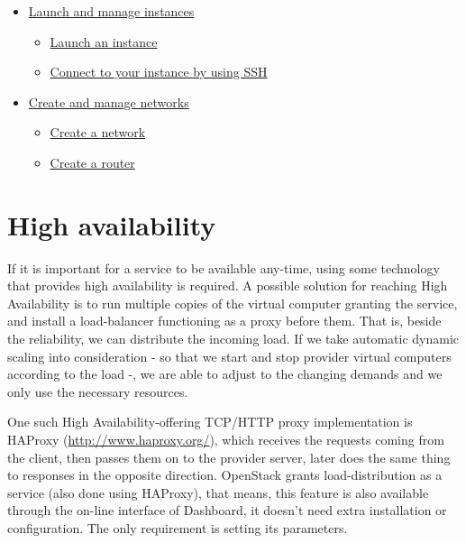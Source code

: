 \documentclass[a4paper]{article}
\begin{document}
\begin{itemize}
\begin{itemize}
\end{itemize}
  \item \href{https://docs.openstack.org/horizon/pike/user/launch-instances.html}{Launch and manage instances}
\begin{itemize}
\item \href{https://docs.openstack.org/horizon/pike/user/launch-instances.html#launch-an-instance}{Launch an instance}
\item \href{https://docs.openstack.org/horizon/pike/user/launch-instances.html#connect-to-your-instance-by-using-ssh}{Connect to your instance by using SSH}
\end{itemize}
  \item \href{https://docs.openstack.org/horizon/pike/user/create-networks.html}{Create and manage networks}
\begin{itemize}
\item \href{https://docs.openstack.org/horizon/pike/user/create-networks.html#create-a-network}{Create a network}
\item \href{https://docs.openstack.org/horizon/pike/user/create-networks.html#create-a-router}{Create a router}
\end{itemize}
\end{itemize}

\section{High availability}

If it is important for a service to be available any-time, using some technology that provides high availability is
required. A possible solution for reaching High Availability is to run multiple copies of the virtual computer granting
the service, and install a load-balancer functioning as a proxy before them. That is, beside the reliability, we can
distribute the incoming load. If we take automatic dynamic scaling into consideration - so that we start and stop
provider virtual computers according to the load -, we are able to adjust to the changing demands and we only use the
necessary resources.

One such High Availability-offering TCP/HTTP proxy implementation is HAProxy (\url{http://www.haproxy.org/}), which
receives the requests coming from the client, then passes them on to the provider server, later does the same thing to
responses in the opposite direction. OpenStack grants load-distribution as a service (also done using HAProxy), that
means, this feature is also available through the on-line interface of Dashboard, it doesn't need extra installation or
configuration. The only requirement is setting its parameters.
\end{document}
